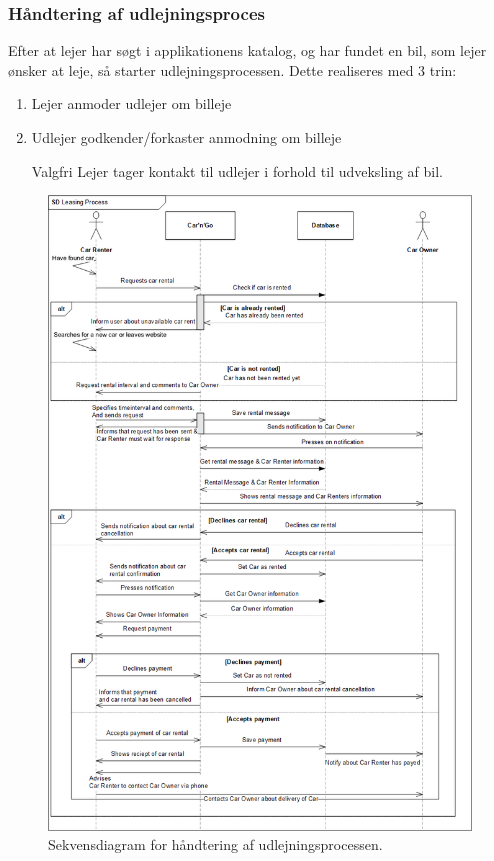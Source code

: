 \documentclass[Arkitektur/System_main.tex]{subfiles}
\begin{document}
\subsubsection{Håndtering af udlejningsproces}
Efter at lejer har søgt i applikationens katalog, og har fundet en bil, som lejer ønsker at leje, så starter udlejningsprocessen. Dette realiseres med 3 trin:
\begin{enumerate}
    \item Lejer anmoder udlejer om billeje 
    \item Udlejer godkender/forkaster anmodning om billeje 
    \item [Valgfri] Lejer tager kontakt til udlejer i forhold til udveksling af bil. 
\end{enumerate}
\begin{figure}[H]
    \centering
    \includegraphics[width=1.1\textwidth]{Arkitektur/Softwarearkitektur/Leasing/graphics/Leasing_processSD.png}
    \caption{Sekvensdiagram for håndtering af udlejningsprocessen.}
    \label{fig:Leasing_processCD}
\end{figure}
\end{document}

